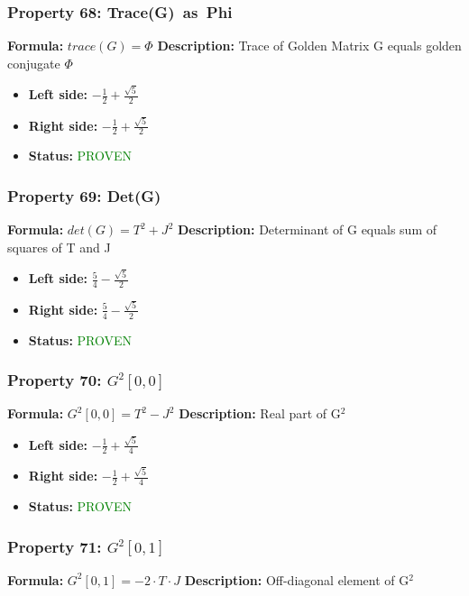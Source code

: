 \subsubsection*{Property 68: Trace(G)~as~Phi}
\textbf{Formula:} $trace(G) = \Phi$
\textbf{Description:} Trace of Golden Matrix G equals golden conjugate $\Phi$

\begin{itemize}
\item \textbf{Left side:} $- \frac{1}{2} + \frac{\sqrt{5}}{2}$
\item \textbf{Right side:} $- \frac{1}{2} + \frac{\sqrt{5}}{2}$
\item \textbf{Status:} \textcolor{green}{PROVEN}
\end{itemize}

\subsubsection*{Property 69: Det(G)}
\textbf{Formula:} $det(G) = T^2 + J^2$
\textbf{Description:} Determinant of G equals sum of squares of T and J

\begin{itemize}
\item \textbf{Left side:} $\frac{5}{4} - \frac{\sqrt{5}}{2}$
\item \textbf{Right side:} $\frac{5}{4} - \frac{\sqrt{5}}{2}$
\item \textbf{Status:} \textcolor{green}{PROVEN}
\end{itemize}

\subsubsection*{Property 70: $G^{2}$$[0,0]$}
\textbf{Formula:} $G^2[0,0] = T^2 - J^2$
\textbf{Description:} Real part of G$^2$

\begin{itemize}
\item \textbf{Left side:} $- \frac{1}{2} + \frac{\sqrt{5}}{4}$
\item \textbf{Right side:} $- \frac{1}{2} + \frac{\sqrt{5}}{4}$
\item \textbf{Status:} \textcolor{green}{PROVEN}
\end{itemize}

\subsubsection*{Property 71: $G^{2}$$[0,1]$}
\textbf{Formula:} $G^2[0,1] = -2 \cdot T \cdot J$
\textbf{Description:} Off-diagonal element of G$^2$

